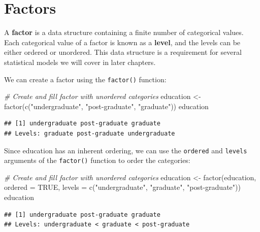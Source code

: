 \documentclass[
]{book}
\newenvironment{Shaded}{\begin{snugshade}}{\end{snugshade}}
\newcommand{\AttributeTok}[1]{\textcolor[rgb]{0.77,0.63,0.00}{#1}}
\newcommand{\CommentTok}[1]{\textcolor[rgb]{0.56,0.35,0.01}{\textit{#1}}}
\newcommand{\ConstantTok}[1]{\textcolor[rgb]{0.00,0.00,0.00}{#1}}
\newcommand{\FunctionTok}[1]{\textcolor[rgb]{0.00,0.00,0.00}{#1}}
\newcommand{\NormalTok}[1]{#1}
\newcommand{\OtherTok}[1]{\textcolor[rgb]{0.56,0.35,0.01}{#1}}
\newcommand{\StringTok}[1]{\textcolor[rgb]{0.31,0.60,0.02}{#1}}
\begin{document}
\hypertarget{factors}{%
\section{Factors}\label{factors}}

A \textbf{factor} is a data structure containing a finite number of categorical values. Each categorical value of a factor is known as a \textbf{level}, and the levels can be either ordered or unordered. This data structure is a requirement for several statistical models we will cover in later chapters.

We can create a factor using the \texttt{factor()} function:

\begin{Shaded}
\begin{Highlighting}[]
\CommentTok{\# Create and fill factor with unordered categories}
\NormalTok{education }\OtherTok{\textless{}{-}} \FunctionTok{factor}\NormalTok{(}\FunctionTok{c}\NormalTok{(}\StringTok{"undergraduate"}\NormalTok{, }\StringTok{"post{-}graduate"}\NormalTok{, }\StringTok{"graduate"}\NormalTok{))}
\NormalTok{education}
\end{Highlighting}
\end{Shaded}

\begin{verbatim}
## [1] undergraduate post-graduate graduate     
## Levels: graduate post-graduate undergraduate
\end{verbatim}

Since education has an inherent ordering, we can use the \texttt{ordered} and \texttt{levels} arguments of the \texttt{factor()} function to order the categories:

\begin{Shaded}
\begin{Highlighting}[]
\CommentTok{\# Create and fill factor with unordered categories}
\NormalTok{education }\OtherTok{\textless{}{-}} \FunctionTok{factor}\NormalTok{(education, }\AttributeTok{ordered =} \ConstantTok{TRUE}\NormalTok{, }\AttributeTok{levels =} \FunctionTok{c}\NormalTok{(}\StringTok{"undergraduate"}\NormalTok{, }\StringTok{"graduate"}\NormalTok{, }\StringTok{"post{-}graduate"}\NormalTok{))}
\NormalTok{education}
\end{Highlighting}
\end{Shaded}

\begin{verbatim}
## [1] undergraduate post-graduate graduate     
## Levels: undergraduate < graduate < post-graduate
\end{verbatim}
\end{document}
